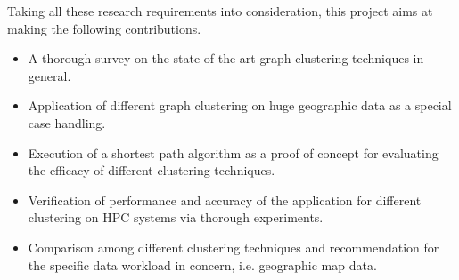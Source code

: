 Taking all these research requirements into consideration, this project aims at making the following contributions.
\begin{itemize}
	\item A thorough survey on the state-of-the-art graph clustering techniques in general.
	\item Application of different graph clustering on huge geographic data as a special case handling.
	\item Execution of a shortest path algorithm as a proof of concept for evaluating the efficacy of different clustering techniques.
	\item Verification of performance and accuracy of the application for different clustering on HPC systems via thorough experiments.
	\item Comparison among different clustering techniques and recommendation for the specific data workload in concern, i.e. geographic map data.
\end{itemize}
